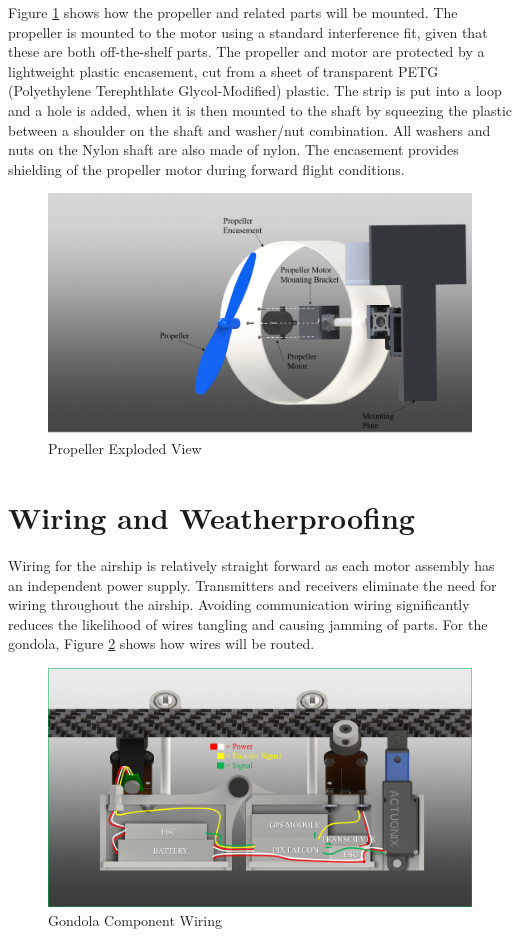 \documentclass[../main.tex]{subfiles}
\begin{document}
 Figure \ref{fig:propAssembly} shows how the propeller and related parts will be mounted. The propeller is mounted to the motor using a standard interference fit, given that these are both off-the-shelf parts. The propeller and motor are protected by a lightweight plastic encasement, cut from a sheet of transparent PETG (Polyethylene Terephthlate Glycol-Modified) plastic. The strip is put into a loop and a hole is added, when it is then mounted to the shaft by squeezing the plastic between a shoulder on the shaft and washer/nut combination. All washers and nuts on the Nylon shaft are also made of nylon. The encasement provides shielding of the propeller motor during forward flight conditions.

\begin{figure}[H]
	\centering
	\includegraphics[width=.8\linewidth]{img/design/thruster/propAssembly.png}
	\caption{Propeller Exploded View}
	\label{fig:propAssembly}
\end{figure}

\section{Wiring and Weatherproofing}
Wiring for the airship is relatively straight forward as each motor assembly has an  independent power supply. Transmitters and receivers eliminate the need for wiring throughout the airship. Avoiding communication wiring significantly reduces the likelihood of wires tangling and causing jamming of parts. For the gondola, Figure \ref{fig:gondolaWiring} shows how wires will be routed. 

\begin{figure}[H]
	\centering
	\includegraphics[width=.8\linewidth]{img/design/gondola/gondolaWiring.png}
	\caption{Gondola Component Wiring}
	\label{fig:gondolaWiring}
\end{figure}
\end{document}
